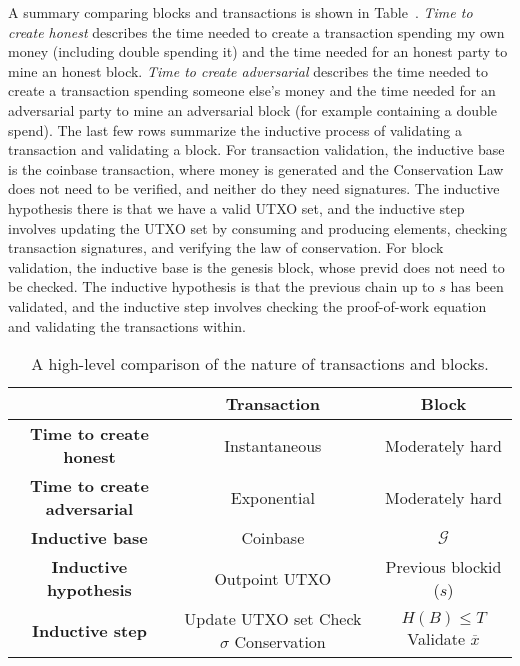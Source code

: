 A summary comparing blocks and transactions is shown in Table~\label{tbl:tx-block-compare}.
\emph{Time to create honest} describes the time needed to create a transaction spending my
own money (including double spending it) and the time needed for an honest party to mine an honest block.
\emph{Time to create adversarial} describes the time needed to create a transaction spending
someone else's money and the time needed for an adversarial party to mine an adversarial
block (for example containing a double spend). The last few rows summarize the inductive
process of validating a transaction and validating a block. For transaction validation, the
inductive base is the coinbase transaction, where money is generated and the Conservation Law
does not need to be verified, and neither do they need signatures.
The inductive hypothesis there is that we have a valid UTXO set,
and the inductive step involves updating the UTXO set by consuming and producing elements,
checking transaction signatures, and verifying the law of conservation. For block validation,
the inductive base is the genesis block, whose previd does not need to be checked. The inductive
hypothesis is that the previous chain up to $s$ has been validated, and the inductive step
involves checking the proof-of-work equation and validating the transactions within.

\begin{table}
\centering
\begin{tabular}{ |c|c|c| }
  \hline
  & \textbf{Transaction} & \textbf{Block} \\
  \hline
  \textbf{Time to create honest} & Instantaneous & Moderately hard \\
  \hline
  \textbf{Time to create adversarial} & Exponential & Moderately hard \\
  \hline
  \textbf{Inductive base} & Coinbase & $\mathcal{G}$ \\
  \hline
  \textbf{Inductive hypothesis} & Outpoint UTXO & Previous blockid ($s$) \\
  \hline
  \textbf{Inductive step} & \makecell{Update UTXO set \\ Check $\sigma$ \\ Conservation} & \makecell{$H(B) \leq T$ \\ Validate $\overline{x}$} \\
  \hline
\end{tabular}
\caption{A high-level comparison of the nature of transactions and blocks.}
\end{table}

